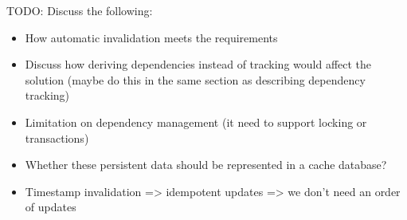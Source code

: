 TODO: Discuss the following:

\begin{itemize}
  \item How automatic invalidation meets the requirements
  \item Discuss how deriving dependencies instead of tracking would affect the solution (maybe do this in the same section as describing dependency tracking)
  \item Limitation on dependency management (it need to support locking or transactions)
  \item Whether these persistent data should be represented in a cache database?
  \item Timestamp invalidation => idempotent updates => we don't need an order of updates
\end{itemize}










